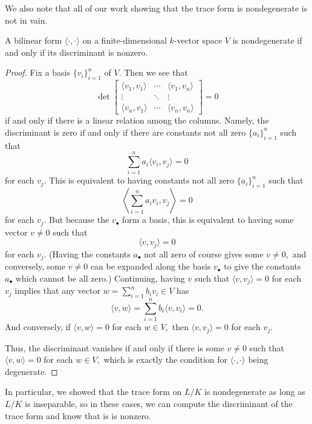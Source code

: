 We also note that all of our work showing that the trace form is nondegenerate is not in vain.
\begin{lemma}
	A bilinear form $\langle\cdot,\cdot\rangle$ on a finite-dimensional $k$-vector space $V$ is nondegenerate if and only if its discriminant is nonzero.
\end{lemma}
\begin{proof}
	Fix a basis $\{v_i\}_{i=1}^n$ of $V.$ Then we see that
	\[\det\begin{bmatrix}
		\langle v_1,v_1\rangle & \cdots & \langle v_1,v_n\rangle \\
		\vdots & \ddots & \vdots \\
		\langle v_n,v_1\rangle & \cdots & \langle v_n,v_n\rangle
	\end{bmatrix}=0\]
	if and only if there is a linear relation among the columns. Namely, the discriminant is zero if and only if there are constants not all zero $\{a_i\}_{i=1}^n$ such that
	\[\sum_{i=1}^na_i\langle v_i,v_j\rangle=0\]
	for each $v_j.$ This is equivalent to having constants not all zero $\{a_i\}_{i=1}^n$ such that
	\[\left\langle\sum_{i=1}^na_iv_i,v_j\right\rangle=0\]
	for each $v_j.$ But because the $v_\bullet$ form a basis, this is equivalent to having some vector $v\ne0$ such that
	\[\langle v,v_j\rangle=0\]
	for each $v_j.$ (Having the constants $a_\bullet$ not all zero of course gives some $v\ne0,$ and conversely, some $v\ne0$ can be expanded along the basis $v_\bullet$ to give the constants $a_\bullet$ which cannot be all zero.) Continuing, having $v$ such that $\langle v,v_j\rangle=0$ for each $v_j$ implies that any vector $w=\sum_{i=1}^nb_iv_i\in V$ has
	\[\langle v,w\rangle=\sum_{i=1}^nb_i\langle v,v_i\rangle=0.\]
	And conversely, if $\langle v,w\rangle=0$ for each $w\in V,$ then $\langle v,v_j\rangle=0$ for each $v_j.$

	Thus, the discriminant vanishes if and only if there is some $v\ne0$ such that $\langle v,w\rangle=0$ for each $w\in V,$ which is exactly the condition for $\langle\cdot,\cdot\rangle$ being degenerate.
\end{proof}
In particular, we showed that the trace form on $L/K$ is nondegenerate as long as $L/K$ is inseparable, so in these cases, we can compute the discriminant of the trace form and know that is is nonzero.

